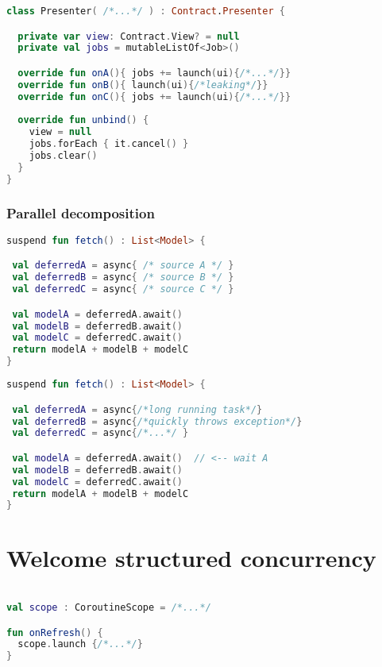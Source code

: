 \documentclass[10pt]{beamer}
\begin{document}
\begin{frame}[fragile]
\begin{lstlisting}[language=Kotlin, basicstyle=\ttfamily]
class Presenter( /*...*/ ) : Contract.Presenter {

  private var view: Contract.View? = null
  private val jobs = mutableListOf<Job>()

  override fun onA(){ jobs += launch(ui){/*...*/}}
  override fun onB(){ launch(ui){/*leaking*/}}
  override fun onC(){ jobs += launch(ui){/*...*/}}
  
  override fun unbind() {
    view = null
    jobs.forEach { it.cancel() } 
    jobs.clear() 
  }
}
\end{lstlisting}
\end{frame}


\begin{frame}[fragile]
\frametitle{Parallel decomposition}
\begin{lstlisting}[language=Kotlin, basicstyle=\ttfamily]
suspend fun fetch() : List<Model> {

 val deferredA = async{ /* source A */ }
 val deferredB = async{ /* source B */ }
 val deferredC = async{ /* source C */ }

 val modelA = deferredA.await() 
 val modelB = deferredB.await() 
 val modelC = deferredC.await() 
 return modelA + modelB + modelC
}
\end{lstlisting}
\end{frame}


\begin{frame}[fragile]
\begin{lstlisting}[language=Kotlin, basicstyle=\ttfamily]
suspend fun fetch() : List<Model> {

 val deferredA = async{/*long running task*/}
 val deferredB = async{/*quickly throws exception*/}
 val deferredC = async{/*...*/ }

 val modelA = deferredA.await()  // <-- wait A
 val modelB = deferredB.await() 
 val modelC = deferredC.await() 
 return modelA + modelB + modelC
}
\end{lstlisting}
\end{frame}

\section{Welcome structured concurrency}

\begin{frame}[fragile]
\begin{lstlisting}[language=Kotlin, basicstyle=\ttfamily]

val scope : CoroutineScope = /*...*/

fun onRefresh() {
  scope.launch {/*...*/}
}
\end{lstlisting}
\end{frame}
\end{document}
